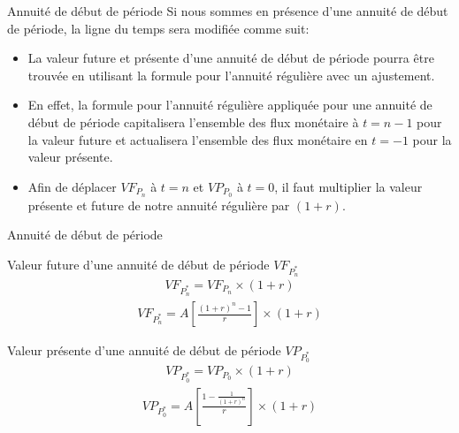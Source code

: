 \documentclass[11pt]{beamer}
\begin{document}
\begin{frame}{Annuité de début de période}
Si nous sommes en présence d'une annuité de début de période, la ligne du temps sera modifiée comme suit: \\

\begin{itemize}
\item La valeur future et présente d'une annuité de début de période pourra être trouvée en utilisant la formule pour l'annuité régulière avec un ajustement. 
\item En effet, la formule pour l'annuité régulière appliquée pour une annuité de début de période capitalisera l'ensemble des flux monétaire à $t=n-1$ pour la valeur future et actualisera l'ensemble des flux monétaire en $t=-1$ pour la valeur présente. 
\item Afin de déplacer $VF_{P_n}$ à $t=n$ et $VP_{P_0}$ à $t=0$, il faut multiplier la valeur présente et future de notre annuité régulière par $(1+r)$.
\end{itemize}
\end{frame}

\begin{frame}{Annuité de début de période}
\begin{block}{Valeur future d'une annuité de début de période $VF_{P_n^*}$}
\begin{align*}
VF_{P_n^*}=VF_{P_n} \times (1+r)
\end{align*}
\begin{align*}
VF_{P_n^*}=A \left[\frac{(1+r)^n-1}{r} \right] \times (1+r)
\end{align*}
\end{block}
\begin{block}{Valeur présente d'une annuité de début de période $VP_{P_0^*}$}
\begin{align*}
VP_{P_0^*}=VP_{P_0} \times (1+r)
\end{align*}
\begin{align*}
VP_{P_0^*}=A \left[ \frac{1-\frac{1}{(1+r)^n}}{r} \right] \times (1+r)
\end{align*}
\end{block}
\end{frame}
\end{document}
